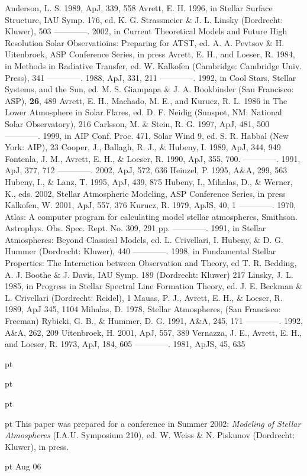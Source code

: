 \documentclass[11pt,twoside]{article}
\def\blankline{\par\vskip 11 pt}
\begin{document}
\begin{references}

%
 Anderson, L. S. 1989, ApJ, 339, 558
%
 Avrett, E. H. 1996, in Stellar Surface Structure, IAU Symp. 176, ed. 
K. G. Strassmeier \& J. L. Linsky (Dordrecht: Kluwer), 503
 {---}{---}{---}{---}. 2002, in Current Theoretical Models and Future High Resolution 
Solar Observatioins: Preparing for ATST, ed. A. A. Pevtsov \& H. Uitenbroek,
ASP Conference Series, in press
%
 Avrett, E. H., and Loeser, R. 1984, in
Methods in Radiative Transfer, ed. W. Kalkofen
(Cambridge: Cambridge Univ. Press), 341
 {---}{---}{---}{---}. 1988, ApJ, 331, 211
 {---}{---}{---}{---}. 1992, in Cool Stars, Stellar Systems, and
the Sun, ed. M. S. Giampapa \& J. A. Bookbinder 
(San Francisco: ASP), {\bf 26}, 489
%
 Avrett, E. H., Machado, M. E., and Kurucz, R. L. 1986
in The Lower Atmosphere in Solar Flares, ed. D. F. Neidig
(Sunspot, NM: National Solar Observatory), 216
%
 Carlsson, M. \& Stein, R. G. 1997, ApJ, 481, 500
 {---}{---}{---}{---}. 1999, in AIP Conf. Proc. 471, Solar Wind 9, 
ed. S. R. Habbal (New York: AIP), 23
%
 Cooper, J., Ballagh, R. J., \& Hubeny, I. 1989, ApJ, 344, 949
%
 Fontenla, J. M., Avrett, E. H., \& Loeser, R. 1990, ApJ, 355, 700.
 {---}{---}{---}{---}. 1991, ApJ, 377, 712
 {---}{---}{---}{---}. 2002, ApJ, 572, 636
%
 Heinzel, P. 1995, A\&A, 299, 563
%
 Hubeny, I., \& Lanz, T. 1995, ApJ, 439, 875
%
 Hubeny, I., Mihalas, D., \& Werner, K., eds. 2002, Stellar Atmospheric
Modeling, ASP Conference Series, in press
%
 Kalkofen, W. 2001, ApJ, 557, 376
%
 Kurucz, R. 1979, ApJS, 40, 1
 {---}{---}{---}{---}. 1970, Atlas: A computer program for calculating model stellar
atmospheres, Smithson. Astrophys. Obs. Spec. Rept. No. 309, 291 pp.
 {---}{---}{---}{---}. 1991, in 
Stellar Atmospheres: Beyond Classical Models,
ed. L. Crivellari, I. Hubeny, \& D. G. Hummer (Dordrecht: Kluwer), 440
 {---}{---}{---}{---}. 1998, in Fundamental Stellar Properties: The Interaction 
between Observation and Theory, ed T. R. Bedding, A. J. Boothe \& J. Davis, IAU Symp. 
189 (Dordrecht: Kluwer) 217
%
 Linsky, J. L. 1985, in Progress in Stellar Spectral Line Formation Theory,
ed. J. E. Beckman \& L. Crivellari (Dordrecht: Reidel), 1
%
 Mauas, P. J., Avrett, E. H., \& Loeser, R. 1989, ApJ 345, 1104
%
 Mihalas, D. 1978, Stellar Atmospheres, (San Francisco: Freeman)
%
 Rybicki, G. B., \& Hummer, D. G. 1991, A\&A, 245, 171
 {---}{---}{---}{---}. 1992, A\&A, 262, 209
%
 Uitenbroek, H. 2001, ApJ, 557, 389
%
 Vernazza, J. E., Avrett, E. H., and Loeser, R. 1973, ApJ, 184, 605
 {---}{---}{---}{---}. 1981, ApJS, 45, 635

\end{references}

\blankline
\blankline
\blankline
\blankline
\noindent This paper was prepared for a conference in Summer 2002: 
{\it Modeling of Stellar Atmospheres} (I.A.U. Symposium 210), 
ed. W. Weiss \& N. Piskunov (Dordrecht: Kluwer), in press.
\blankline
{} Aug 06
\end{document}

